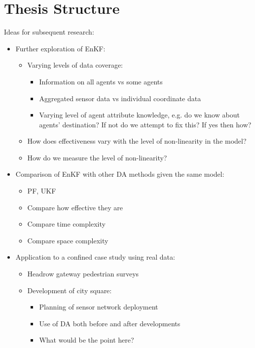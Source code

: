 \section{Thesis Structure}\label{sec:structure}

Ideas for subsequent research:
\begin{itemize}
    \item Further exploration of EnKF:
    \begin{itemize}
        \item Varying levels of data coverage:
        \begin{itemize}
            \item Information on all agents vs some agents
            \item Aggregated sensor data vs individual coordinate data
            \item Varying level of agent attribute knowledge, e.g. do we know
                about agents' destination? If not do we attempt to fix this? If
                yes then how?
        \end{itemize}
        \item How does effectiveness vary with the level of non-linearity in the
            model?
        \item How do we measure the level of non-linearity?
    \end{itemize}
    \item Comparison of EnKF with other DA methods given the same model:
    \begin{itemize}
        \item PF, UKF
        \item Compare how effective they are
        \item Compare time complexity
        \item Compare space complexity
    \end{itemize}
    \item Application to a confined case study using real data:
    \begin{itemize}
        \item Headrow gateway pedestrian surveys
        \item Development of city square:
        \begin{itemize}
            \item Planning of sensor network deployment
            \item Use of DA both before and after developments
            \item What would be the point here?
        \end{itemize}
    \end{itemize}
\end{itemize}

